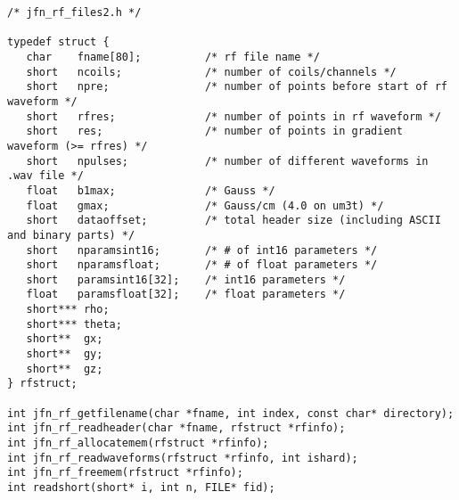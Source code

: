\begin{lstlisting}
/* jfn_rf_files2.h */

typedef struct {
   char    fname[80];          /* rf file name */
   short   ncoils;             /* number of coils/channels */
   short   npre;               /* number of points before start of rf waveform */
   short   rfres;              /* number of points in rf waveform */
   short   res;                /* number of points in gradient waveform (>= rfres) */
   short   npulses;            /* number of different waveforms in .wav file */
   float   b1max;              /* Gauss */
   float   gmax;               /* Gauss/cm (4.0 on um3t) */
   short   dataoffset;         /* total header size (including ASCII and binary parts) */
   short   nparamsint16;       /* # of int16 parameters */
   short   nparamsfloat;       /* # of float parameters */
   short   paramsint16[32];    /* int16 parameters */
   float   paramsfloat[32];    /* float parameters */
   short*** rho;
   short*** theta;
   short**  gx;
   short**  gy;
   short**  gz;
} rfstruct;

int jfn_rf_getfilename(char *fname, int index, const char* directory);
int jfn_rf_readheader(char *fname, rfstruct *rfinfo);
int jfn_rf_allocatemem(rfstruct *rfinfo);
int jfn_rf_readwaveforms(rfstruct *rfinfo, int ishard);
int jfn_rf_freemem(rfstruct *rfinfo);
int readshort(short* i, int n, FILE* fid);

\end{lstlisting}



